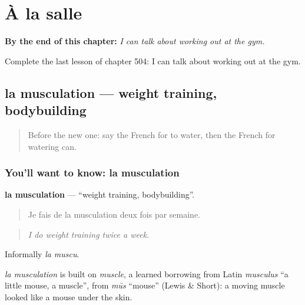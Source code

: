 
\chapter{À la salle}
\label{ch:fr-a-la-salle}

\begin{chapteropening}
\textbf{By the end of this chapter:} \emph{I can talk about working out at the gym.}

Complete the last lesson of chapter 504: I can talk about working out at the gym.
\end{chapteropening}

\section[la musculation]{la musculation — weight training, bodybuilding}

\label{lesson:FR-C504-musculation}



\begin{quote}
Before the new one: say the French for to water, then the French for watering can.
\end{quote}

\subsection*{You'll want to know: la musculation}
\textbf{la musculation} — \textquotedblleft{}weight training, bodybuilding\textquotedblright{}.

\begin{quote}
Je fais de la musculation deux fois par semaine.
\end{quote}

\begin{quote}
\emph{I do weight training twice a week.}
\end{quote}

Informally \emph{la muscu}.

\begin{cousinweb}
\emph{la musculation} is built on \emph{muscle}, a learned borrowing from Latin \emph{musculus} \textquotedblleft{}a little mouse, a muscle\textquotedblright{}, from \emph{mūs} \textquotedblleft{}mouse\textquotedblright{} (Lewis \& Short): a moving muscle looked like a mouse under the skin.
\end{cousinweb}

